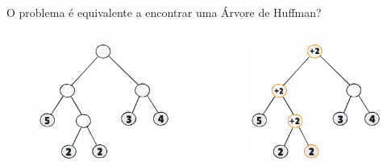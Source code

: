 \documentclass[12pt]{beamer}
\begin{document}
\begin{frame}
\begin{bloco}
O problema é equivalente a encontrar uma Árvore de Huffman?

\begin{columns}
\begin{column}{0.4\textwidth}
\begin{figure}
    \centering
    \includegraphics[width=\linewidth]{img/ht1.png}
    \label{fig:enter-label}
\end{figure}
\end{column}
\begin{column}{0.4\textwidth}
\begin{figure}
    \centering
    \includegraphics[width=\linewidth]{img/ht2.png}
    \label{fig:enter-label}
\end{figure}
\end{column}
\end{columns}
\end{bloco}
\end{frame}
\end{document}
